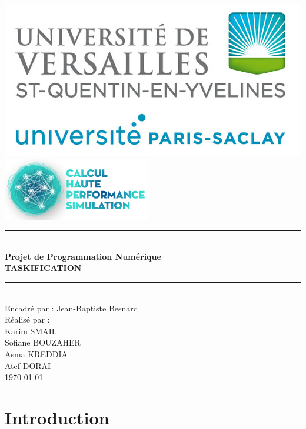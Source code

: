 \documentclass[12pt,titlepage]{article}
\begin{document}
\begin{titlepage}
\newcommand{\HRule}{\rule{\linewidth}{0.1mm}}
\center

\includegraphics[scale=0.4]{logo.png} \\[0.2cm]
\includegraphics[scale=0.7]{CHPS_logo.png} \\[0.2cm]

\HRule \\[0.4cm]
{ \huge \bfseries Projet de Programmation Numérique \\ TASKIFICATION
  \\[0.15cm] }
\HRule \\[1.5cm]
Encadré par : Jean-Baptiste Besnard
\\Réalisé par : \\ Karim SMAIL\\ Sofiane BOUZAHER  \\ Asma  KREDDIA\\ Atef DORAI 
\\[1cm]
\today \\ [1cm]
\end{titlepage}


\renewcommand*\contentsname{Sommaire}
\tableofcontents

\pagebreak
\section{Introduction}
\end{document}
